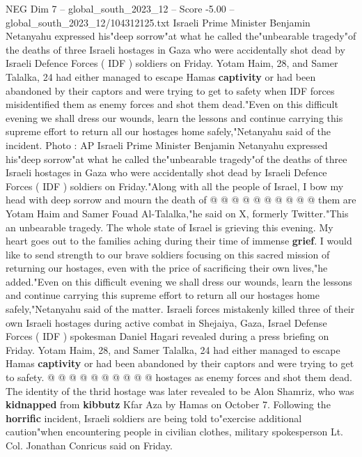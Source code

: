 \begin{textsample}{NEG Dim 7 – global\_south\_2023\_12 – Score -5.00 – global\_south\_2023\_12/104312125.txt}  \label{ex:f7_neg_418}
Israeli Prime Minister Benjamin Netanyahu expressed his"deep sorrow"at what he called the"unbearable tragedy"of the deaths of three Israeli hostages in Gaza who were accidentally shot dead by Israeli Defence Forces ( IDF ) soldiers on Friday.
Yotam Haim, 28, and Samer Talalka, 24 had either managed to escape Hamas \textbf{captivity} or had been abandoned by their captors and were trying to get to safety when IDF forces misidentified them as enemy forces and shot them dead."Even on this difficult evening we shall dress our wounds, learn the lessons and continue carrying this supreme effort to return all our hostages home safely,"Netanyahu said of the incident.
Photo : AP Israeli Prime Minister Benjamin Netanyahu expressed his"deep sorrow"at what he called the"unbearable tragedy"of the deaths of three Israeli hostages in Gaza who were accidentally shot dead by Israeli Defence Forces ( IDF ) soldiers on Friday."Along with all the people of Israel, I bow my head with deep sorrow and mourn the death of @ @ @ @ @ @ @ @ @ @ them are Yotam Haim and Samer Fouad Al-Talalka,"he said on X, formerly Twitter."This an unbearable tragedy.
The whole state of Israel is grieving this evening.
My heart goes out to the families aching during their time of immense \textbf{grief}.
I would like to send strength to our brave soldiers focusing on this sacred mission of returning our hostages, even with the price of sacrificing their own lives,"he added."Even on this difficult evening we shall dress our wounds, learn the lessons and continue carrying this supreme effort to return all our hostages home safely,"Netanyahu said of the matter.
Israeli forces mistakenly killed three of their own Israeli hostages during active combat in Shejaiya, Gaza, Israel Defense Forces ( IDF ) spokesman Daniel Hagari revealed during a press briefing on Friday.
Yotam Haim, 28, and Samer Talalka, 24 had either managed to escape Hamas \textbf{captivity} or had been abandoned by their captors and were trying to get to safety. @ @ @ @ @ @ @ @ @ @ hostages as enemy forces and shot them dead.
The identity of the thrid hostage was later revealed to be Alon Shamriz, who was \textbf{kidnapped} from \textbf{kibbutz} Kfar Aza by Hamas on October 7.
Following the \textbf{horrific} incident, Israeli soldiers are being told to"exercise additional caution"when encountering people in civilian clothes, military spokesperson Lt.
Col.
Jonathan Conricus said on Friday.

\end{textsample}
